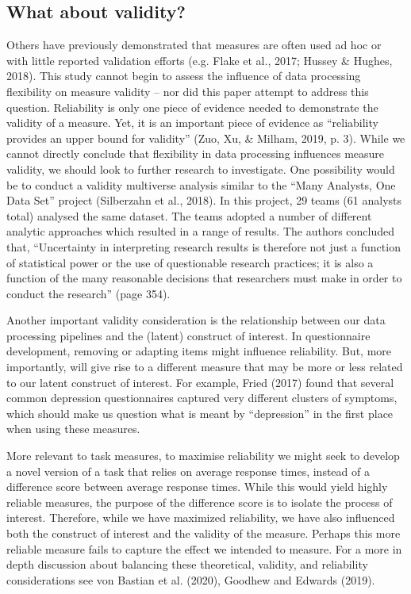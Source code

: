 \documentclass[
  man,floatsintext]{apa6}
\begin{document}
\hypertarget{what-about-validity}{%
\subsection{What about validity?}\label{what-about-validity}}

Others have previously demonstrated that measures are often used ad hoc or with little reported validation efforts (e.g. Flake et al., 2017; Hussey \& Hughes, 2018). This study cannot begin to assess the influence of data processing flexibility on measure validity -- nor did this paper attempt to address this question. Reliability is only one piece of evidence needed to demonstrate the validity of a measure. Yet, it is an important piece of evidence as ``reliability provides an upper bound for validity'' (Zuo, Xu, \& Milham, 2019, p. 3). While we cannot directly conclude that flexibility in data processing influences measure validity, we should look to further research to investigate. One possibility would be to conduct a validity multiverse analysis similar to the ``Many Analysts, One Data Set'' project (Silberzahn et al., 2018). In this project, 29 teams (61 analysts total) analysed the same dataset. The teams adopted a number of different analytic approaches which resulted in a range of results. The authors concluded that, ``Uncertainty in interpreting research results is therefore not just a function of statistical power or the use of questionable research practices; it is also a function of the many reasonable decisions that researchers must make in order to conduct the research'' (page 354).

Another important validity consideration is the relationship between our data processing pipelines and the (latent) construct of interest. In questionnaire development, removing or adapting items might influence reliability. But, more importantly, will give rise to a different measure that may be more or less related to our latent construct of interest. For example, Fried (2017) found that several common depression questionnaires captured very different clusters of symptoms, which should make us question what is meant by ``depression'' in the first place when using these measures.

More relevant to task measures, to maximise reliability we might seek to develop a novel version of a task that relies on average response times, instead of a difference score between average response times. While this would yield highly reliable measures, the purpose of the difference score is to isolate the process of interest. Therefore, while we have maximized reliability, we have also influenced both the construct of interest and the validity of the measure. Perhaps this more reliable measure fails to capture the effect we intended to measure. For a more in depth discussion about balancing these theoretical, validity, and reliability considerations see von Bastian et al. (2020), Goodhew and Edwards (2019).
\end{document}
